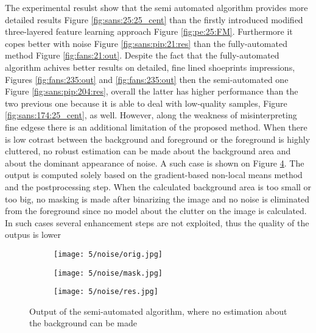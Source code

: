 \documentclass[draft,final]{vutinfth} %
\begin{document}
\par
The experimental resulst show that the semi automated algorithm provides more detailed results Figure \ref{fig:sans:25:25_cent} than the firstly introduced modified three-layered feature learning approach Figure \ref{fig:pe:25:FM}.
Furthermore it copes better with noise Figure \ref{fig:sans:pip:21:res} than the fully-automated method Figure \ref{fig:fans:21:out}.
Despite the fact that the fully-automated algorithm achives better results on detailed, fine lined shoeprints impressions, Figures \ref{fig:fans:235:out} and \ref{fig:fans:235:out} then the semi-automated one Figure \ref{fig:sans:pip:204:res}, overall the latter has higher performance than the two previous one because it is able to deal with low-quality samples, Figure \ref{fig:sans:174:25_cent}, as well.
However, along the weakness of misinterpreting fine edgese there is an additional limitation of the proposed method.
When there is low cotrast between the background and foreground or the foreground is highly cluttered, no robust estimation can be made about the background area and about the dominant appearance of noise.
A such case is shown on Figure \ref{fig:sans:noise}.
The output is computed solely based on the gradient-based non-local means method and the postprocessing step.
When the calculated background area is too small or too big, no masking is made after binarizing the image and no noise is eliminated from the foreground since no model about the clutter on the image is calculated.
In such cases several enhancement steps are not exploited, thus the quality of the outpus is lower

\begin{figure}[h]
  \centering
  \begin{subfigure}[b]{0.3\columnwidth}
    \centering
    \texttt{[image: 5/noise/orig.jpg]}
    \label{fig:sans:noise:orig}
  \end{subfigure}
  \begin{subfigure}[b]{0.3\columnwidth}
    \centering
    \texttt{[image: 5/noise/mask.jpg]}
    \label{fig:sans:noise:mask}
  \end{subfigure}
  \begin{subfigure}[b]{0.3\columnwidth}
    \centering
   \texttt{[image: 5/noise/res.jpg]}
    \label{fig:sans:noise:res}
  \end{subfigure}
 
  \caption{Output of the semi-automated algorithm, where no estimation about the background can be made}
  \label{fig:sans:noise}
\end{figure}
\end{document}
